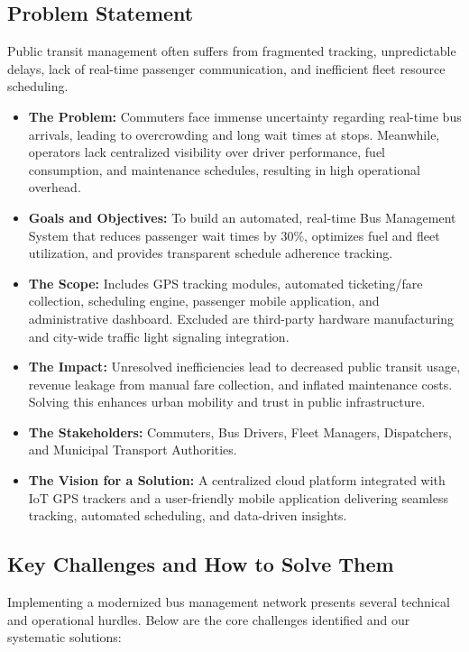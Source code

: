 \documentclass[11pt, a4paper]{article}
\begin{document}
\subsection{Problem Statement}
Public transit management often suffers from fragmented tracking, unpredictable delays, lack of real-time passenger communication, and inefficient fleet resource scheduling. 

\begin{itemize}[leftmargin=*]
    \item \textbf{The Problem:} Commuters face immense uncertainty regarding real-time bus arrivals, leading to overcrowding and long wait times at stops. Meanwhile, operators lack centralized visibility over driver performance, fuel consumption, and maintenance schedules, resulting in high operational overhead.
    \item \textbf{Goals and Objectives:} To build an automated, real-time Bus Management System that reduces passenger wait times by 30\%, optimizes fuel and fleet utilization, and provides transparent schedule adherence tracking.
    \item \textbf{The Scope:} Includes GPS tracking modules, automated ticketing/fare collection, scheduling engine, passenger mobile application, and administrative dashboard. Excluded are third-party hardware manufacturing and city-wide traffic light signaling integration.
    \item \textbf{The Impact:} Unresolved inefficiencies lead to decreased public transit usage, revenue leakage from manual fare collection, and inflated maintenance costs. Solving this enhances urban mobility and trust in public infrastructure.
    \item \textbf{The Stakeholders:} Commuters, Bus Drivers, Fleet Managers, Dispatchers, and Municipal Transport Authorities.
    \item \textbf{The Vision for a Solution:} A centralized cloud platform integrated with IoT GPS trackers and a user-friendly mobile application delivering seamless tracking, automated scheduling, and data-driven insights.
\end{itemize}

\subsection{Key Challenges and How to Solve Them}
Implementing a modernized bus management network presents several technical and operational hurdles. Below are the core challenges identified and our systematic solutions:
\end{document}
